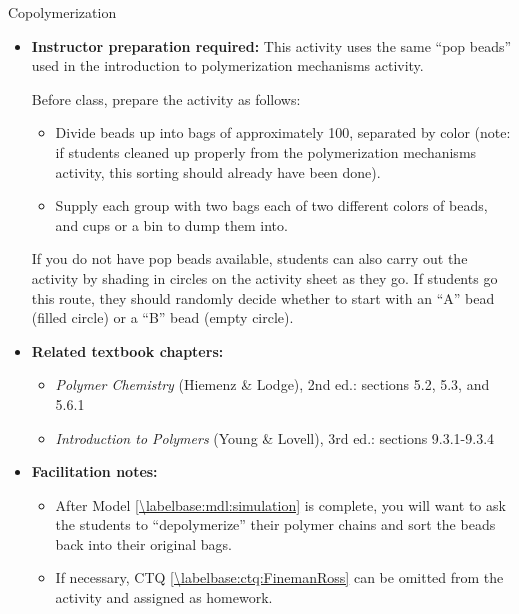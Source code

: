\begin{activity}{Copolymerization}
\begin{instructornotes}
\begin{itemize}
			\emph{Note: Model \ref{\labelbase:mdl:simulation} takes approximately 25 minutes; the activity can be split after this model and completed in a later class period as long as students have completely filled in the CTQs re. the types of polymer sequences observed.}
			
		\item \textbf{Instructor preparation required:} This activity uses the same ``pop beads'' used in the introduction to polymerization mechanisms activity.
		
			Before class, prepare the activity as follows:
				\begin{itemize}
					\item Divide beads up into bags of approximately 100, separated by color (note: if students cleaned up properly from the polymerization mechanisms activity, this sorting should already have been done).
					\item Supply each group with two bags each of two different colors of beads, and cups or a bin to dump them into.
				\end{itemize}
			
			If you do not have pop beads available, students can also carry out the activity by shading in circles on the activity sheet as they go.  If students go this route, they should randomly decide whether to start with an ``A'' bead (filled circle) or a ``B'' bead (empty circle).
			
		\item \textbf{Related textbook chapters:}
			\begin{itemize}
				\item \emph{Polymer Chemistry} (Hiemenz \& Lodge), 2nd ed.: sections 5.2, 5.3, and 5.6.1
				\item \emph{Introduction to Polymers} (Young \& Lovell), 3rd ed.: sections 9.3.1-9.3.4
			\end{itemize}
			
		\item \textbf{Facilitation notes:}
			\begin{itemize}
				\item After Model \ref{\labelbase:mdl:simulation} is complete, you will want to ask the students to ``depolymerize'' their polymer chains and sort the beads back into their original bags.
				\item If necessary, CTQ \ref{\labelbase:ctq:FinemanRoss} can be omitted from the activity and assigned as homework.
			\end{itemize}
	\end{itemize}
	

\end{instructornotes}
\end{activity}
